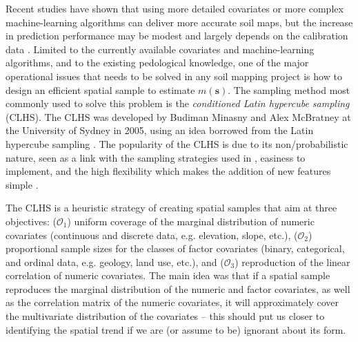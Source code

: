 Recent studies have shown that using more detailed covariates or more complex machine-learning algorithms can 
deliver more accurate soil maps, but the increase in prediction performance may be modest 
\cite{Samuel-RosaEtAl2015} and largely depends on the calibration data \cite{HeungEtAl2016}. Limited to the 
currently available covariates and machine-learning algorithms, and to the existing pedological knowledge, one 
of the major operational issues that needs to be solved in any soil mapping project is how to design an 
efficient spatial sample to estimate $m(\boldsymbol{s})$. The sampling method most commonly used to solve this 
problem is the \emph{conditioned Latin hypercube sampling} (CLHS). The CLHS was developed by Budiman Minasny 
and Alex McBratney at the University of Sydney in 2005, using an idea borrowed from the Latin hypercube 
sampling \cite{McKayEtAl1979, MinasnyEtAl2006b}. The popularity of the CLHS is due to its non\-/probabilistic 
nature, seen as a link with the sampling strategies used in , easiness to 
implement, and the high flexibility which makes the addition of new features simple \cite{MinasnyEtAl2010a, 
RoudierEtAl2012, MulderEtAl2013, CarvalhoJuniorEtAl2014, CliffordEtAl2014}.

The CLHS is a heuristic strategy of creating spatial samples that aim at three objectives: ($\mathcal{O}_1$) 
uniform coverage of the marginal distribution of numeric covariates (continuous and discrete data, e.g. 
elevation, slope, etc.), ($\mathcal{O}_2$) proportional sample sizes for the classes of factor covariates 
(binary, categorical, and ordinal data, e.g. geology, land use, etc.), and ($\mathcal{O}_3$) reproduction of 
the linear correlation of numeric covariates. The main idea was that if a spatial sample reproduces the 
marginal distribution of the numeric and factor covariates, as well as the correlation matrix of the numeric 
covariates, it will approximately cover the multivariate distribution of the covariates -- this should put us 
closer to identifying the  spatial trend if we are (or assume to be) ignorant about its form.

